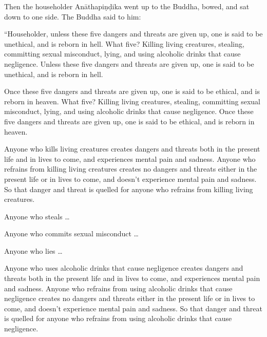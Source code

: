\documentclass[12pt,openany]{book}%
\begin{document}
Then the householder \textsanskrit{Anāthapiṇḍika} went up to the Buddha, bowed, and sat down to one side. The Buddha said to him: 

“Householder, unless these five dangers and threats are given up, one is said to be unethical, and is reborn in hell. What five? Killing living creatures, stealing, committing sexual misconduct, lying, and using alcoholic drinks that cause negligence. Unless these five dangers and threats are given up, one is said to be unethical, and is reborn in hell. 

Once these five dangers and threats are given up, one is said to be ethical, and is reborn in heaven. What five? Killing living creatures, stealing, committing sexual misconduct, lying, and using alcoholic drinks that cause negligence. Once these five dangers and threats are given up, one is said to be ethical, and is reborn in heaven. 

Anyone who kills living creatures creates dangers and threats both in the present life and in lives to come, and experiences mental pain and sadness. Anyone who refrains from killing living creatures creates no dangers and threats either in the present life or in lives to come, and doesn’t experience mental pain and sadness. So that danger and threat is quelled for anyone who refrains from killing living creatures. 

Anyone who steals … 

Anyone who commits sexual misconduct … 

Anyone who lies … 

Anyone who uses alcoholic drinks that cause negligence creates dangers and threats both in the present life and in lives to come, and experiences mental pain and sadness. Anyone who refrains from using alcoholic drinks that cause negligence creates no dangers and threats either in the present life or in lives to come, and doesn’t experience mental pain and sadness. So that danger and threat is quelled for anyone who refrains from using alcoholic drinks that cause negligence. 
\end{document}

